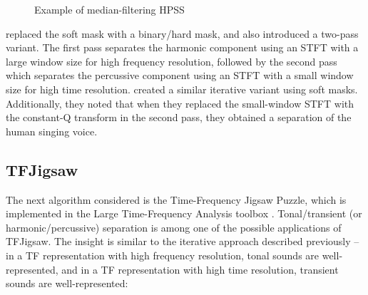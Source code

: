 \documentclass[letter,12pt]{article}
\begin{document}
\begin{figure}[ht]
	\centering
	\caption{Example of median-filtering HPSS}
	\label{fig:fitz1}
\end{figure}

\citet{driedger} replaced the soft mask with a binary/hard mask, and also introduced a two-pass variant. The first pass separates the harmonic component using an STFT with a large window size for high frequency resolution, followed by the second pass which separates the percussive component using an STFT with a small window size for high time resolution. \citet{fitzgerald2} created a similar iterative variant using soft masks. Additionally, they noted that when they replaced the small-window STFT with the constant-Q transform in the second pass, they obtained a separation of the human singing voice.

\subsection{TFJigsaw}

The next algorithm considered is the Time-Frequency Jigsaw Puzzle\cite{tfjigsaw}, which is implemented in the Large Time-Frequency Analysis toolbox \cite{ltfat, tfjigsaw2, tfjigsaw3}. Tonal/transient (or harmonic/percussive) separation is among one of the possible applications of TFJigsaw. The insight is similar to the iterative approach described previously -- in a TF representation with high frequency resolution, tonal sounds are well-represented, and in a TF representation with high time resolution, transient sounds are well-represented:
\end{document}
